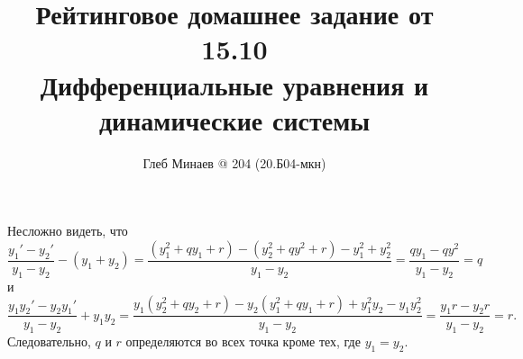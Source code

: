 \documentclass[12pt,a4paper]{article}
\title{Рейтинговое домашнее задание от 15.10\\Дифференциальные уравнения и динамические системы}
\author{Глеб Минаев @ 204 (20.Б04-мкн)}
\date{}
\begin{document}
    \maketitle

    \begin{problem}{6}
        Несложно видеть, что
        \[
            \frac{y_1' - y_2'}{y_1 - y_2} - (y_1 + y_2)
            = \frac{(y_1^2 + q y_1 + r) - (y_2^2 + q y^2 + r) - y_1^2 + y_2^2}{y_1 - y_2}
            = \frac{q y_1 - q y^2}{y_1 - y_2}
            = q
        \]
        и
        \[
            \frac{y_1 y_2' - y_2 y_1'}{y_1 - y_2} + y_1 y_2
            = \frac{y_1 (y_2^2 + q y_2 + r) - y_2 (y_1^2 + q y_1 + r) + y_1^2 y_2 - y_1 y_2^2}{y_1 - y_2}
            = \frac{y_1 r - y_2 r}{y_1 - y_2}
            = r.
        \]
        Следовательно, $q$ и $r$ определяются во всех точка кроме тех, где $y_1 = y_2$.
    \end{problem}
\end{document}

